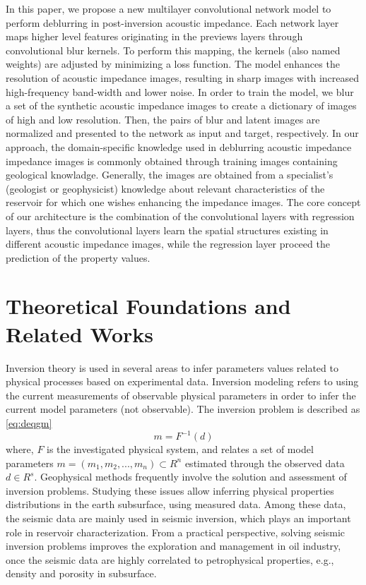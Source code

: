 \documentclass[conference]{IEEEtran}
\begin{document}
In this paper, we propose a new multilayer convolutional network model to perform deblurring in post-inversion acoustic impedance.
Each network layer maps higher level features originating in the previews layers through convolutional blur kernels.
To perform this mapping, the kernels (also named weights) are adjusted by minimizing a loss function. 
The model enhances the resolution of acoustic impedance images, resulting in sharp images with
increased high-frequency band-width and lower noise.
In order to train the model, we blur a set of the synthetic acoustic impedance images to create a dictionary of
images of high and low resolution. Then, the pairs of blur and latent images are normalized and 
presented to the network as input and target, respectively.
In our approach, the domain-specific knowledge used in deblurring acoustic impedance impedance images is commonly
obtained through training images containing geological knowladge. Generally, the images are obtained from a specialist's
(geologist or geophysicist) knowledge about relevant characteristics of the reservoir for which one wishes enhancing the impedance images.
The core concept of our architecture is the combination of the convolutional layers with regression layers, thus the convolutional layers learn the spatial structures existing in different acoustic impedance images, while the regression layer proceed the prediction of the property values.

\section{Theoretical Foundations and Related Works}
Inversion theory is used in several areas to infer parameters values
related to physical processes based on experimental data.
Inversion modeling refers to using the current measurements of observable
physical parameters in order to infer the current model parameters (not observable).
The inversion problem is described as  \eqref{eq:deqgm}
\begin{equation}
\label{eq:deqgm}
m = F^{-1}(d)
\end{equation}
where, $F$ is the investigated physical system, and relates a set of model parameters
$m=(m_1, m_2,...,m_n) \subset R^n$ estimated through the observed data $d \in R^s$.
Geophysical methods frequently involve the solution and assessment of inversion problems.
Studying these issues allow inferring physical properties distributions in the earth subsurface, using measured
data. Among these data, the seismic data are mainly used in seismic inversion, which plays an important role in
reservoir characterization. From a practical perspective, solving seismic inversion problems improves
the exploration and management in oil industry, once the seismic data are highly correlated to petrophysical
properties, e.g., density and porosity in subsurface.
\end{document}
